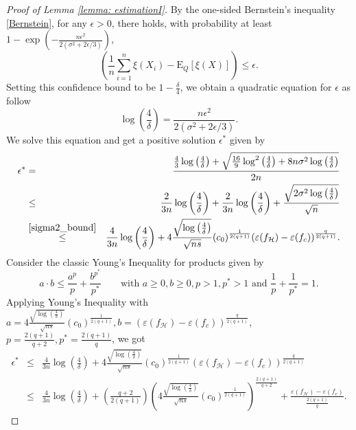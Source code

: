 \documentclass{article}
\begin{document}
\begin{proof}[Proof of Lemma \ref{lemma: estimationI}]
By the one-sided Bernstein’s inequality \eqref{Bernstein}, for any $\epsilon >0$, there holds, with probability at least $1- \exp\left(-\frac{n\epsilon^2}{2(\sigma^2+2\epsilon/3)}\right)$, 
\begin{equation*}
    \left(\frac{1}{n}\sum_{i=1}^{n} \xi(X_i) - \mathrm{E}_Q[\xi(X)]\right) \leq \epsilon. 
\end{equation*}
Setting this confidence bound to be $1-\frac{\delta}{4}$, we obtain a quadratic equation for $\epsilon$ as follow
\begin{equation*}
    \log\left(\frac{4}{\delta}\right) = \frac{n\epsilon^2}{2(\sigma^2+2\epsilon/3)}.
\end{equation*}
We solve this equation and get a positive solution $\epsilon^*$ given by
\begin{eqnarray*}
    \epsilon^*  &=& \frac{\frac{4}{3} \log\left(\frac{4}{\delta}\right)+ \sqrt{\frac{16}{9}\log^2\left(\frac{4}{\delta}\right)+8n\sigma^2\log\left(\frac{4}{\delta}\right) }}{2n}\\
    &\leq&  \frac{2}{3n} \log\left(\frac{4}{\delta}\right) + \frac{2}{3n} \log\left(\frac{4}{\delta}\right) + \frac{\sqrt{2\sigma^2\log\left(\frac{4}{\delta}\right)}}{\sqrt{n}}\\    &\stackrel{\eqref{sigma2_bound}}{\leq}& \frac{4}{3n} \log\left(\frac{4}{\delta}\right) + 4 \frac{\sqrt{\log\left(\frac{4}{\delta}\right)}}{\sqrt{ns}}  (c_0)^{\frac{1}{2(q+1)}} (\varepsilon(f_\mathcal{H}) - \varepsilon(f_c)) ^{\frac{q}{2(q+1)}}.
\end{eqnarray*}
Consider the classic  
 Young's Inequality for products \citep{young1912classes} given by 
 \begin{equation}\label{Young}
        a\cdot b \leq \frac{a^p}{p}+ \frac{b^{p^*}}{p^*} \qquad \text{with    } a\geq 0,b \geq 0, p>1,p^*>1 \text{ and } \frac{1}{p}+ \frac{1}{p^*} = 1.
    \end{equation}
Applying  Young's Inequality with $a= 4 \frac{\sqrt{\log\left(\frac{4}{\delta}\right)}}{\sqrt{ns}}  (c_0)^{\frac{1}{2(q+1)}} , b= (\varepsilon(f_\mathcal{H}) - \varepsilon(f_c)) ^{\frac{q}{2(q+1)}}$, $p= \frac{2(q+1)}{q+2}, p^* = \frac{2(q+1)}{q}$, we got
\begin{eqnarray}\label{epsilon*}
     \epsilon^* &\leq&  \frac{4}{3n} \log\left(\frac{4}{\delta}\right) + 4 \frac{\sqrt{\log\left(\frac{4}{\delta}\right)}}{\sqrt{ns}}  (c_0)^{\frac{1}{2(q+1)}} (\varepsilon(f_\mathcal{H}) - \varepsilon(f_c)) ^{\frac{q}{2(q+1)}} \nonumber\\
     &\leq& \frac{4}{3n} \log\left(\frac{4}{\delta}\right) + \left(\frac{q+2}{2(q+1)}\right)\left(4 \frac{\sqrt{\log\left(\frac{4}{\delta}\right)}}{\sqrt{ns}}  (c_0)^{\frac{1}{2(q+1)}}\right)^{\frac{2(q+1)}{q+2}} + 
 \frac{\varepsilon(f_\mathcal{H}) - \varepsilon(f_c)}{{\frac{2(q+1)}{q}}}.
\end{eqnarray}


\end{proof}
\end{document}
